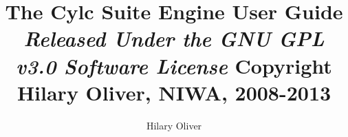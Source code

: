\documentclass[11pt,a4paper,titlepage]{article}
\title{The Cylc Suite Engine\linebreak 
User Guide \linebreak 
{\em \small
} \linebreak
{\em \small Released Under the GNU GPL v3.0 Software License} \linebreak
{\small Copyright Hilary Oliver, NIWA, 2008-2013}}
\author{Hilary Oliver}
\begin{document}
\maketitle

\pagebreak



\pagebreak
\tableofcontents
\listoffigures

\pagebreak

\end{document}

